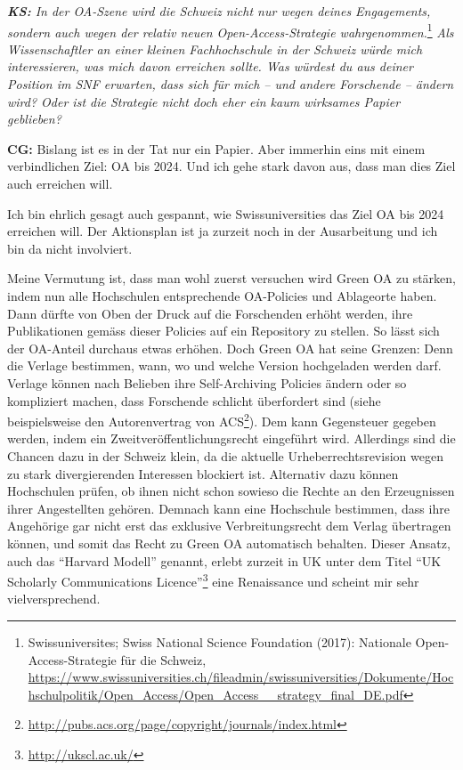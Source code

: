 \documentclass[a4paper,
fontsize=11pt,
oneside,
numbers=noperiodatend,
parskip=half-,
bibliography=totoc,
final
]{scrartcl}
\begin{document}
\emph{\textbf{KS:} In der OA-Szene wird die Schweiz nicht nur wegen
deines Engagements, sondern auch wegen der relativ neuen
Open-Access-Strategie wahrgenommen.}\footnote{Swissuniversites; Swiss
  National Science Foundation (2017): Nationale Open-Access-Strategie
  für die Schweiz,
  \url{https://www.swissuniversities.ch/fileadmin/swissuniversities/Dokumente/Hochschulpolitik/Open_Access/Open_Access__strategy_final_DE.pdf}}
\emph{Als Wissenschaftler an einer kleinen Fachhochschule in der Schweiz
würde mich interessieren, was mich davon erreichen sollte. Was würdest
du aus deiner Position im SNF erwarten, dass sich für mich -- und andere
Forschende -- ändern wird? Oder ist die Strategie nicht doch eher ein
kaum wirksames Papier geblieben?}

\textbf{CG:} Bislang ist es in der Tat nur ein Papier. Aber immerhin
eins mit einem verbindlichen Ziel: OA bis 2024. Und ich gehe stark davon
aus, dass man dies Ziel auch erreichen will.

Ich bin ehrlich gesagt auch gespannt, wie Swissuniversities das Ziel OA
bis 2024 erreichen will. Der Aktionsplan ist ja zurzeit noch in der
Ausarbeitung und ich bin da nicht involviert.

Meine Vermutung ist, dass man wohl zuerst versuchen wird Green OA zu
stärken, indem nun alle Hochschulen entsprechende OA-Policies und
Ablageorte haben. Dann dürfte von Oben der Druck auf die Forschenden
erhöht werden, ihre Publikationen gemäss dieser Policies auf ein
Repository zu stellen. So lässt sich der OA-Anteil durchaus etwas
erhöhen. Doch Green OA hat seine Grenzen: Denn die Verlage bestimmen,
wann, wo und welche Version hochgeladen werden darf. Verlage können nach
Belieben ihre Self-Archiving Policies ändern oder so kompliziert machen,
dass Forschende schlicht überfordert sind (siehe beispielsweise den
Autorenvertrag von ACS\footnote{\url{http://pubs.acs.org/page/copyright/journals/index.html}}).
Dem kann Gegensteuer gegeben werden, indem ein
Zweitveröffentlichungsrecht eingeführt wird. Allerdings sind die Chancen
dazu in der Schweiz klein, da die aktuelle Urheberrechtsrevision wegen
zu stark divergierenden Interessen blockiert ist. Alternativ dazu können
Hochschulen prüfen, ob ihnen nicht schon sowieso die Rechte an den
Erzeugnissen ihrer Angestellten gehören. Demnach kann eine Hochschule
bestimmen, dass ihre Angehörige gar nicht erst das exklusive
Verbreitungsrecht dem Verlag übertragen können, und somit das Recht zu
Green OA automatisch behalten. Dieser Ansatz, auch das \enquote{Harvard
Modell} genannt, erlebt zurzeit in UK unter dem Titel \enquote{UK
Scholarly Communications Licence}\footnote{\url{http://ukscl.ac.uk/}}
eine Renaissance und scheint mir sehr vielversprechend.
\end{document}
